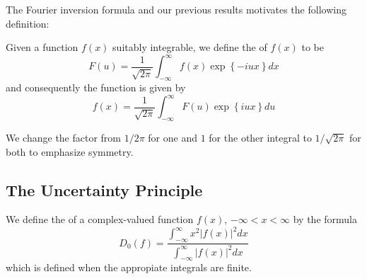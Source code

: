 \documentclass[12pt, a4paper, oneside, openright, titlepage]{book}
\begin{document}
The Fourier inversion formula and our previous results motivates the following definition: 

\begin{defn}
    Given a function $f(x)$ suitably integrable, we define the  of $f(x)$ to be \begin{equation}
        F(u) = \frac{1}{\sqrt{2\pi}}\int_{-\infty}^{\infty}f(x)\exp\left\{-iu x\right\}dx
    \end{equation}
    and consequently the function is given by \begin{equation}
        f(x) = \frac{1}{\sqrt{2\pi}}\int_{-\infty}^{\infty}F(u)\exp\left\{iu x\right\}du
    \end{equation}
\end{defn}

We change the factor from $1/2\pi$ for one and $1$ for the other integral to $1/\sqrt{2\pi}$ for both to emphasize symmetry.


\subsection{The Uncertainty Principle}

\begin{defn}
    We define the  of a complex-valued function $f(x)$, $-\infty < x < \infty$ by the formula \begin{equation*}
        D_0(f) = \frac{\int_{-\infty}^{\infty}x^2|f(x)|^2dx}{\int_{-\infty}^{\infty}|f(x)|^2dx}
    \end{equation*}
    which is defined when the appropiate integrals are finite.
\end{defn}
\end{document}
